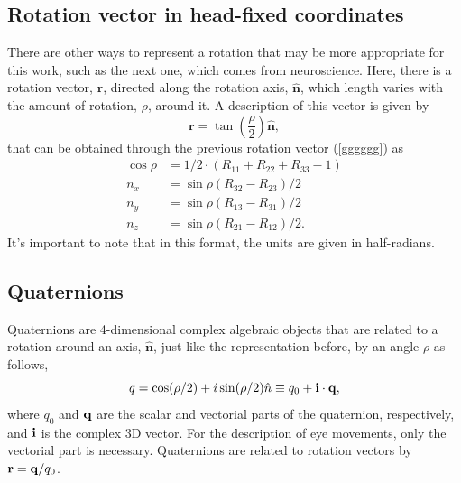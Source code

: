 \subsection{Rotation vector in head-fixed coordinates}
\label{killme}
There are other ways to represent a rotation that may be more appropriate for this work, such as the next one, which comes from neuroscience. Here, there is a rotation vector, $\mathbf{r}$, directed along the rotation axis, $\hat{\mathbf{n}}$, which length varies with the amount of rotation, $\rho$, around it. A description of this vector is given by 
\begin{equation}
\mathbf{r} = \tan (\frac{\rho}{2}) \hat{ \mathbf{n}},
\end{equation}
that can be obtained through the previous rotation vector (\ref{gggggg}) as 
\begin{equation}
\label{sec2:eq:n}
\begin{aligned} 
\cos \rho & = 1 / 2 \cdot \left( R _ { 11 } + R _ { 22 } + R _ { 33 } - 1 \right) \\ 
n_ { x } & = \sin \rho \left( R _ { 32 } - R _ { 23 } \right) / 2  \\ 
n _ { y } & = \sin \rho \left( R _ { 13 } - R _ { 31 } \right) / 2  \\ 
n _ { z } & = \sin \rho \left( R _ { 21 } - R _ { 12 } \right) / 2  .
\end{aligned}
\end{equation}
It's important to note that in this format, the units are given in half-radians.

\subsection{Quaternions}
Quaternions are 4-dimensional complex algebraic objects that are related to a rotation around an axis, $\hat{ \mathbf{n}}$, just like the representation before, by an angle $\rho$ as follows,
\begin{equation}
\label{sec2:eq:q}
q = \cos ( \rho / 2 ) + i \sin ( \rho / 2 ) \hat{n} \equiv q _ { 0 } + {\bf i}\cdot  {\bf q},
\end{equation}
where $q_0$ and ${\bf q}$ are the scalar and vectorial parts of the quaternion, respectively, and ${\bf i}$ is the complex 3D vector. For the description of eye movements, only the vectorial part is necessary. Quaternions are related to rotation vectors by $ \mathbf{r}  = {\bf q} / q _ { 0 }$.
\cite{rep}

